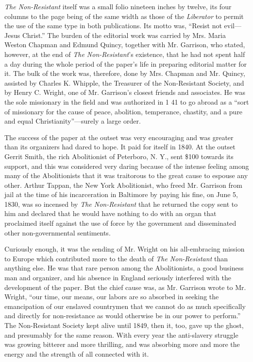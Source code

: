 \documentclass{book}
\begin{document}
\emph{The Non-Resistant} itself was a small folio nineteen inches by twelve, its four columns to the page being of the same width as those of the \emph{Liberator} to permit the use of the same type in both publications. Its motto was, “Resist not evil—Jesus Christ.” The burden of the editorial work was carried by Mrs. Maria Weston Chapman and Edmund Quincy, together with Mr. Garrison, who stated, however, at the end of \emph{The Non-Resistant}’s existence, that he had not spent half a day during the whole period of the paper’s life in preparing editorial matter for it. The bulk of the work was, therefore, done by Mrs. Chapman and Mr. Quincy, assisted by Charles K. Whipple, the Treasurer of the Non-Resistant Society, and by Henry C. Wright, one of Mr. Garrison’s closest friends and associates. He was the sole missionary in the field and was authorized in 1 41 to go abroad as a “sort of missionary for the cause of peace, abolition, temperance, chastity, and a pure and equal Christianity”—surely a large order.

The success of the paper at the outset was very encouraging and was greater than its organizers had dared to hope. It paid for itself in 1840. At the outset Gerrit Smith, the rich Abolitionist of Peterboro, N. Y., sent \$100 towards its support, and this was considered very daring because of the intense feeling among many of the Abolitionists that it was traitorous to the great cause to espouse any other. Arthur Tappan, the New York Abolitionist, who freed Mr. Garrison from jail at the time of his incarceration in Baltimore by paying his fine, on June 5, 1830, was so incensed by \emph{The Non-Resistant} that he returned the copy sent to him and declared that he would have nothing to do with an organ that proclaimed itself against the use of force by the government and disseminated other non-governmental sentiments.

Curiously enough, it was the sending of Mr. Wright on his all-embracing mission to Europe which contributed more to the death of \emph{The Non-Resistant} than anything else. He was that rare person among the Abolitionists, a good business man and organizer, and his absence in England seriously interfered with the development of the paper. But the chief cause was, as Mr. Garrison wrote to Mr. Wright, “our time, our means, our labors are so absorbed in seeking the emancipation of our enslaved countrymen that we cannot do as much specifically and directly for non-resistance as would otherwise be in our power to perform.” The Non-Resistant Society kept alive until 1849, then it, too, gave up the ghost, and presumably for the same reason. With every year the anti-slavery struggle was growing bitterer and more thrilling, and was absorbing more and more the energy and the strength of all connected with it.
\end{document}
